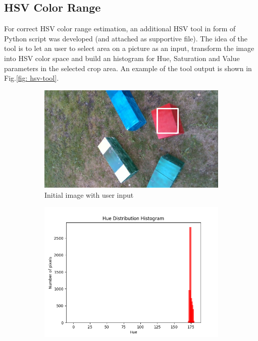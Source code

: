 \documentclass{ctuthesis}
\begin{document}
\subsection{HSV Color Range}
For correct HSV color range estimation, an additional HSV tool in form of Python script was developed (and attached as supportive file). The idea of the tool is to let an user to select area on a picture as an input, transform the image into HSV color space and build an histogram for Hue, Saturation and Value parameters in the selected crop area. An example of the tool output is shown in Fig.\ref{fig: hsv-tool}.
\begin{figure}[htbp]
     \centering
     \begin{subfigure}{0.475\textwidth}
         \centering
         \includegraphics[width=\textwidth]{HSV_all.png}
         \caption{Initial image with user input}
         \label{fig: hsv a}
     \end{subfigure}
     \hfill
     \begin{subfigure}{0.475\textwidth}
         \centering
         \includegraphics[width=\textwidth]{HSV_H.png}

\end{subfigure}
\end{figure}
\end{document}
